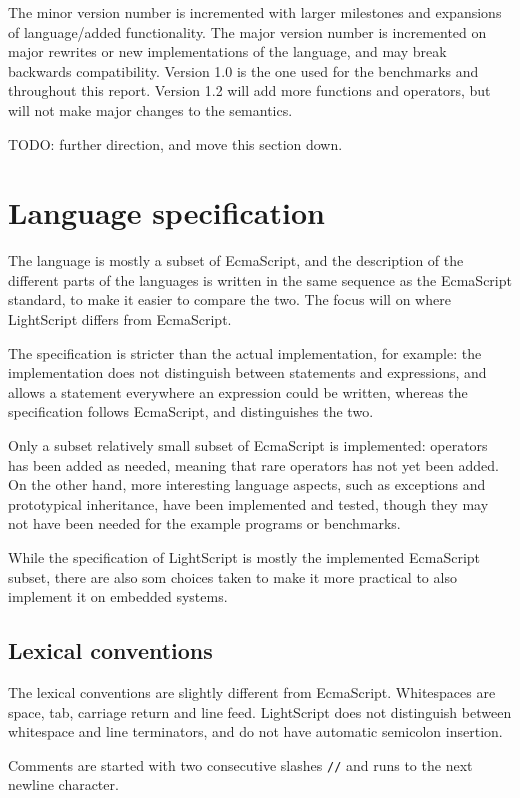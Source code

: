 \documentclass[11pt]{report}
\begin{document}
The minor version number is incremented with larger milestones and expansions of language/added functionality. 
The major version number is incremented on major rewrites or new implementations of the language, and may break backwards compatibility.
Version 1.0 is the one used for the benchmarks and throughout this report. 
Version 1.2 will add more functions and operators, but will not make major changes to the semantics.

TODO: further direction, and move this section down.

\section{Language specification}
The language is mostly a subset of EcmaScript, and the description of the different parts of the languages is written in the same sequence as the EcmaScript standard, to make it easier to compare the two. The focus will on where LightScript differs from EcmaScript.

The specification is stricter than the actual implementation, for example: the implementation does not distinguish between statements and expressions, and allows a statement everywhere an expression could be written, whereas the specification follows EcmaScript, and distinguishes the two.

Only a subset relatively small subset of EcmaScript is implemented: operators has been added as needed, meaning that rare operators has not yet been added. 
On the other hand, more interesting language aspects, such as exceptions and prototypical inheritance, have been implemented and tested, though they may not have been needed for the example programs or benchmarks.

While the specification of LightScript is mostly the implemented EcmaScript subset, there are also som choices taken to make it more practical to also implement it on embedded systems.


\subsection{Lexical conventions}
The lexical conventions are slightly different from EcmaScript. 
Whitespaces are space, tab, carriage return and line feed. 
LightScript does not distinguish between whitespace and line terminators, and do not have automatic semicolon insertion.

Comments are started with two consecutive slashes \verb|//| and runs to the next newline character.
\end{document}
